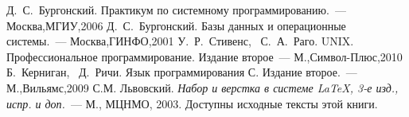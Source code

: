 ﻿
\begin{thebibliography}{2010}

Д.~С.~Бургонский. Практикум по системному программированию.~---
Москва,МГИУ,2006
Д.~С.~Бургонский. Базы данных и операционные системы.~---
Москва,ГИНФО,2001
У.~Р.~Стивенс, ~С.~А.~Раго. UNIX. Профессиональное программирование. Издание второе~--- М.,Символ-Плюс,2010
Б.~Керниган, ~Д.~Ричи. Язык программирования С. Издание второе.~--- М.,Вильямс,2009
С.М. Львовский.
{\em Набор и верстка в системе \LaTeX, 3-е изд., испр. и доп.}~---
М., МЦНМО, 2003. Доступны исходные тексты этой книги.

\end{thebibliography}

\endinput
